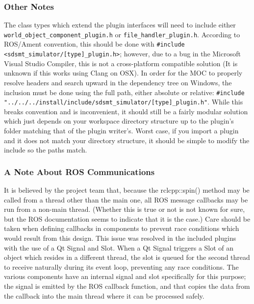 \begin{itemize}
\subsubsection*{Other Notes}
The class types which extend the plugin interfaces will need to include either \lstinline|world_object_component_plugin.h| or \lstinline|file_handler_plugin.h|. According to ROS/Ament convention, this should be done with \lstinline|#include <sdsmt_simulator/[type]_plugin.h>|; however, due to a bug in the Microsoft Visual Studio Compiler, this is not a cross-platform compatible solution (It is unknown if this works using Clang on OSX). In order for the MOC to properly resolve headers and search upward in the dependency tree on Windows, the inclusion must be done using the full path, either absolute or relative: \lstinline|#include "../../../install/include/sdsmt_simulator/[type]_plugin.h"|. While this breaks convention and is inconvenient, it should still be a fairly modular solution which just depends on your workspace directory structure up to the plugin's folder matching that of the plugin writer's. Worst case, if you import a plugin and it does not match your directory structure, it should be simple to modify the include so the paths match.

\subsubsection*{A Note About ROS Communications}
It is believed by the project team that, because the rclcpp::spin() method may be called from a thread other than the main one, all ROS message callbacks may be run from a non-main thread. (Whether this is true or not is not known for sure, but the ROS documentation seems to indicate that it is the case.) Care should be taken when defining callbacks in components to prevent race conditions which would result from this design. This issue was resolved in the included plugins with the use of a Qt Signal and Slot. When a Qt Signal triggers a Slot of an object which resides in a different thread, the slot is queued for the second thread to receive naturally during its event loop, preventing any race conditions. The various components have an internal signal and slot specifically for this purpose; the signal is emitted by the ROS callback function, and that copies the data from the callback into the main thread where it can be processed safely.

\end{itemize}
